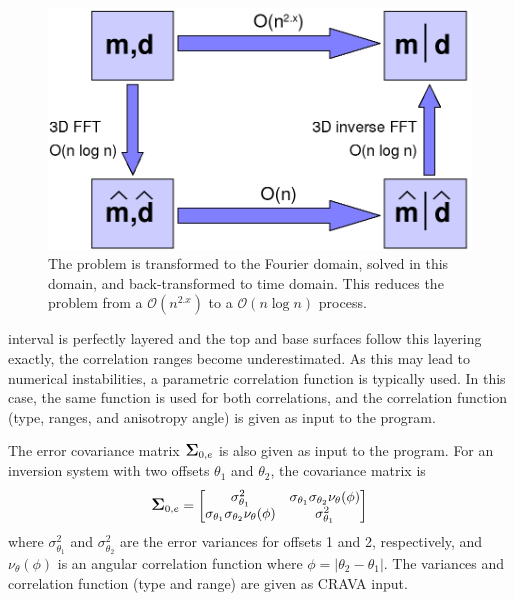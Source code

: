 \documentclass[screen,citenumeric,long,10pt]{nrdoc_060418}
\newcommand{\bSigma}{\mbox{\large\ensuremath{\boldsymbol{\Sigma}}}}
\newcommand{\crava} {\textsf{CRAVA}\xspace}
\begin{document}
\begin{multicols}{2}
\begin{figure}[H]
  \includegraphics[width=.99\linewidth]{images/FFT_flowdiagram}
  \caption{The problem is transformed to the Fourier domain, solved
  in this domain, and back-transformed to time domain. This reduces
  the problem from a $\mathcal{O}(n^{2.x})$ to a $\mathcal{O}(n\log
  n)$ process.} 
  \label{fig:FFT-flowdiagram}
\end{figure}

\noindent
interval is perfectly layered and the top and base surfaces follow
this layering exactly, the correlation ranges become
underestimated. As this may lead to numerical instabilities, a
parametric correlation function is typically used. In this case, the
same function is used for both correlations, and the correlation
function (type, ranges, and anisotropy angle) is given as input to the
program.  

The error covariance matrix $\bSigma_{0,e}$ is also given as input
to the program. For an inversion system with two offsets $\theta_1$ and
$\theta_2$, the covariance matrix is 
%
\begin{equation}
\bSigma_{0,e} = 
\begin{bmatrix}
\sigma^2_{\theta_1}                                      
& \sigma_{\theta_1}\sigma_{\theta_2}\nu_\theta(\phi)\\
\sigma_{\theta_1}\sigma_{\theta_2}\nu_\theta(\phi) 
& \sigma^2_{\theta_1}\\
\end{bmatrix}
\end{equation}
%
\noindent
where $\sigma^2_{\theta_1}$ and $\sigma^2_{\theta_2}$ are the error
variances for offsets 1 and 2, respectively, and $\nu_\theta(\phi)$ is
an angular correlation function where $\phi=|\theta_2-\theta_1|$. The
variances and correlation function (type and range) are given as
\crava input.  


\end{multicols}
\end{document}
